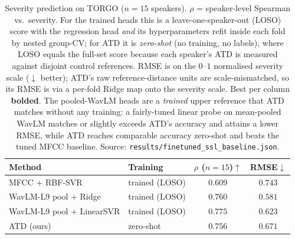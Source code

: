 \begin{table}[t]
\centering
\caption{Severity prediction on TORGO ($n=15$ speakers). $\rho$ =
speaker-level Spearman vs.\ severity. For the trained heads this is a
leave-one-speaker-out (LOSO) score with the regression head \emph{and} its
hyperparameters refit inside each fold by nested group-CV; for ATD it is
\emph{zero-shot} (no training, no labels), where LOSO equals the full-set
score because each speaker's ATD is measured against disjoint control
references. RMSE is on the $0$--$1$ normalised severity scale
($\downarrow$ better); ATD's raw reference-distance units are
scale-mismatched, so its RMSE is via a per-fold Ridge map onto the
severity scale. Best per column \textbf{bolded}. The pooled-WavLM heads
are a \emph{trained} upper reference that ATD matches without any training:
a fairly-tuned linear probe on mean-pooled WavLM matches or slightly
exceeds ATD's accuracy and attains a lower RMSE, while ATD reaches
comparable accuracy zero-shot and beats the tuned MFCC baseline. Source:
\texttt{results/finetuned\_ssl\_baseline.json}.}
\label{tab:main_results}\label{tab:main}
\begin{tabular}{llcc}
\toprule
Method & Training & $\rho$ ($n{=}15$)$\uparrow$ & RMSE$\downarrow$ \\
\midrule
MFCC + RBF-SVR            & trained (LOSO) & $0.609$ & $0.743$ \\
WavLM-L9 pool + Ridge     & trained (LOSO) & $0.760$ & $\mathbf{0.581}$ \\
WavLM-L9 pool + LinearSVR & trained (LOSO) & $\mathbf{0.775}$ & $0.623$ \\
\midrule
ATD (ours)               & zero-shot      & $0.756$ & $0.671$ \\
\bottomrule
\end{tabular}
\end{table}
